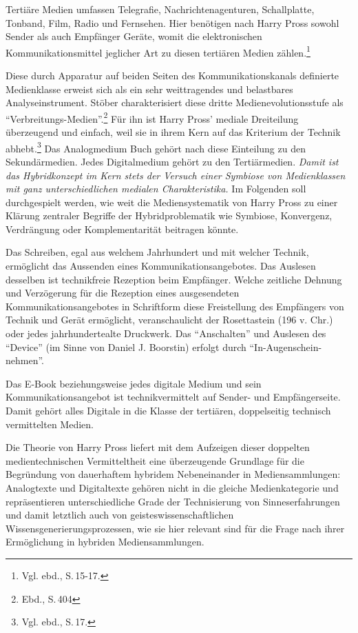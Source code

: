 \documentclass[a4paper,
fontsize=11pt,
oneside,
numbers=noperiodatend,
parskip=half-,
bibliography=totoc,
final
]{scrartcl}
\begin{document}
Tertiäre Medien umfassen Telegrafie, Nachrichtenagenturen, Schallplatte,
Tonband, Film, Radio und Fernsehen. Hier benötigen nach Harry Pross
sowohl Sender als auch Empfänger Geräte, womit die elektronischen
Kommunikationsmittel jeglicher Art zu diesen tertiären Medien
zählen.\footnote{Vgl. ebd., S.\,15-17.}

Diese durch Apparatur auf beiden Seiten des Kommunikationskanals
definierte Medienklasse erweist sich als ein sehr weittragendes und
belastbares Analyseinstrument. Stöber charakterisiert diese dritte
Medienevolutionsstufe als \enquote{Verbreitungs-Medien}.\footnote{Ebd.,
  S.\,404} Für ihn ist Harry Pross' mediale Dreiteilung überzeugend und
einfach, weil sie in ihrem Kern auf das Kriterium der Technik
abhebt.\footnote{Vgl. ebd., S.\,17.} Das Analogmedium Buch gehört nach
diese Einteilung zu den Sekundärmedien. Jedes Digitalmedium gehört zu
den Tertiärmedien. \emph{Damit ist das Hybridkonzept im Kern stets der
Versuch einer Symbiose von Medienklassen mit ganz unterschiedlichen
medialen Charakteristika.} Im Folgenden soll durchgespielt werden, wie
weit die Mediensystematik von Harry Pross zu einer Klärung zentraler
Begriffe der Hybridproblematik wie Symbiose, Konvergenz, Verdrängung
oder Komplementarität beitragen könnte.

Das Schreiben, egal aus welchem Jahrhundert und mit welcher Technik,
ermöglicht das Aussenden eines Kommunikationsangebotes. Das Auslesen
desselben ist technikfreie Rezeption beim Empfänger. Welche zeitliche
Dehnung und Verzögerung für die Rezeption eines ausgesendeten
Kommunikationsangebotes in Schriftform diese Freistellung des Empfängers
von Technik und Gerät ermöglicht, veranschaulicht der Rosettastein (196
v. Chr.) oder jedes jahrhundertealte Druckwerk. Das \enquote{Anschalten}
und Auslesen des \enquote{Device} (im Sinne von Daniel J. Boorstin)
erfolgt durch \enquote{In-Augenschein-nehmen}.

Das E-Book beziehungsweise jedes digitale Medium und sein
Kommunikationsangebot ist technikvermittelt auf Sender- und
Empfängerseite. Damit gehört alles Digitale in die Klasse der tertiären,
doppelseitig technisch vermittelten Medien.

Die Theorie von Harry Pross liefert mit dem Aufzeigen dieser doppelten
medientechnischen Vermitteltheit eine überzeugende Grundlage für die
Begründung von dauerhaftem hybridem Nebeneinander in Mediensammlungen:
Analogtexte und Digitaltexte gehören nicht in die gleiche
Medienkategorie und repräsentieren unterschiedliche Grade der
Technisierung von Sinneserfahrungen und damit letztlich auch von
geisteswissenschaftlichen Wissensgenerierungsprozessen, wie sie hier
relevant sind für die Frage nach ihrer Ermöglichung in hybriden
Mediensammlungen.
\end{document}
